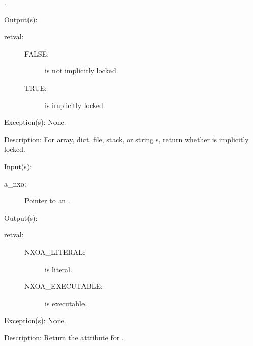 \begin{capi}
\begin{capilist}
\begin{description}
			.
		\end{description}
	\item[Output(s): ]
		\begin{description}\item[]
		\item[retval: ]
			\begin{description}\item[]
			\item[FALSE: ]
				 is not implicitly locked.
			\item[TRUE: ]
				 is implicitly locked.
			\end{description}
		\end{description}
	\item[Exception(s): ] None.
	\item[Description: ]
		For array, dict, file, stack, or string s,
		return whether  is implicitly locked.
	\end{capilist}
\label{nxo_attr_get}
	\begin{capilist}
	\item[Input(s): ]
		\begin{description}\item[]
		\item[a\_nxo: ]
			Pointer to an .
		\end{description}
	\item[Output(s): ]
		\begin{description}\item[]
		\item[retval: ]
			\begin{description}\item[]
			\item[NXOA\_LITERAL: ]
				 is literal.
			\item[NXOA\_EXECUTABLE: ]
				 is executable.
			\end{description}
		\end{description}
	\item[Exception(s): ] None.
	\item[Description: ]
		Return the attribute for .
	\end{capilist}
\label{nxo_attr_set}
	\begin{capilist}

\end{capilist}
\end{capi}
